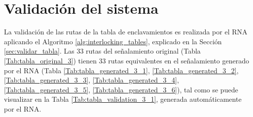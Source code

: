 \section{Validación del sistema}

	La validación de las rutas de la tabla de enclavamientos es realizada por el RNA aplicando el Algoritmo \ref{alg:interlocking_tables}, explicado en la Sección \ref{sec:validar_tabla}. Las 33 rutas del señalamiento original (Tabla \ref{Tab:tabla_original_3}) tienen 33 rutas equivalentes en el señalamiento generado por el RNA (Tabla \ref{Tab:tabla_generated_3_1}, \ref{Tab:tabla_generated_3_2}, \ref{Tab:tabla_generated_3_3}, \ref{Tab:tabla_generated_3_4}, \ref{Tab:tabla_generated_3_5}, \ref{Tab:tabla_generated_3_6}), tal como se puede visualizar en la Tabla \ref{Tab:tabla_validation_3_1}, generada automáticamente por el RNA. %

